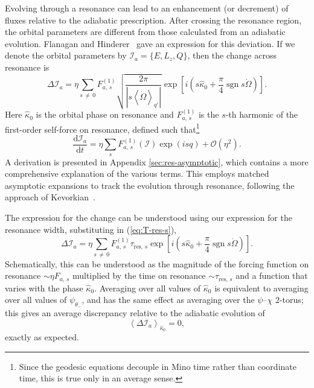 \documentclass[aps,prd,amsfonts,amssymb,amsmath,nofootinbib,reprint,showpacs,superscriptaddress,twocolumn]{revtex4}
\newcommand{\eqnref}[1]{(\ref{eq:#1})}
\newcommand{\apref}[1]{Appendix \ref{sec:#1}}
\newcommand{\dd}{\ensuremath{\mathrm{d}}}
\newcommand{\diff}[2]{\ensuremath{\dfrac{\dd {#1}}{\dd {#2}}}}
\newcommand{\order}[1]{\ensuremath{\mathcal{O}({#1})}}
\DeclareMathOperator{\sgn}{sgn}
\begin{document}
Evolving through a resonance can lead to an enhancement (or decrement) of fluxes relative to the adiabatic prescription. After crossing the resonance region, the orbital parameters are different from those calculated from an adiabatic evolution. Flanagan and Hinderer~\cite{Flanagan2012} gave an expression for this deviation. If we denote the orbital parameters by $\mathcal{I}_a = \{E,L_z,Q\}$, then the change across resonance is
\begin{equation}
\Delta \mathcal{I}_a = \eta\sum_{s\,\neq\,0}F_{a,\,s}^{(1)}\sqrt{\dfrac{2\pi}{\left|s \left\langle\dot{\Omega}\right\rangle_{q'}\right|}}\exp\left[i\left(s \widehat{\kappa}_0 + \dfrac{\pi}{4} \sgn s\dot{\Omega}\right)\right]. 
\end{equation}
Here $\widehat{\kappa}_0$ is the orbital phase on resonance and $F_{a,\,s}^{(1)}$ is the $s$-th harmonic of the first-order self-force on resonance, defined such that\footnote{Since the geodesic equations decouple in Mino time rather than coordinate time, this is true only in an average sense.}
\begin{equation}
\diff{\mathcal{I}_a}{t} = \eta\sum_s F_{a,\,s}^{(1)}(\boldsymbol{\mathcal{I}})\exp(is q) + \order{\eta^2}.
\end{equation}
A derivation is presented in \apref{res-asymptotic}, which contains a more comprehensive explanation of the various terms. This employs matched asymptotic expansions to track the evolution through resonance, following the approach of Kevorkian~\cite{Kevorkian1987}.

The expression for the change can be understood using our expression for the resonance width, substituting in \eqnref{T-res-s},
\begin{equation}
\label{eq:delta-I-a}
\Delta \mathcal{I}_a = \eta\sum_{s\,\neq\,0}F_{a,\,s}^{(1)}\tau_{\mathrm{res},\,s}\exp\left[i\left(s \widehat{\kappa}_0 + \dfrac{\pi}{4} \sgn s\dot{\Omega}\right)\right]. 
\end{equation}
Schematically, this can be understood as the magnitude of the forcing function on resonance $\sim \eta F_{a,\,s}$ multiplied by the time on resonance $\sim \tau_{\mathrm{res},\,s}$ and a function that varies with the phase $\widehat{\kappa}_0$. Averaging over all values of $\widehat{\kappa}_0$ is equivalent to averaging over all values of $\psi_{\theta_-}$, and has the same effect as averaging over the $\psi$--$\chi$ $2$-torus; this gives an average discrepancy relative to the adiabatic evolution of
\begin{equation}
\left\langle \Delta \mathcal{I}_a \right\rangle_{\hat{\kappa}_0} = 0,
\end{equation}
exactly as expected.
\end{document}
